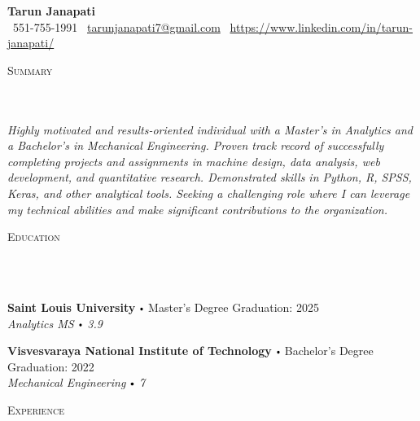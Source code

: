 \documentclass{article}
\newcommand{\school}[4]{
        \textbf{#1} \labelitemi #2 \hfill #3 \\ #4 \vspace*{5pt}
      }
\newcommand{\lineunder}{
        \vspace*{-8pt} \\ \hspace*{-18pt} 
        \hrulefill \\
        }
\newcommand{\header}[1]{{
        \hspace*{-15pt}\vspace*{6pt} \textsc{#1}} \vspace*{-6pt} 
        \lineunder
        }
\renewcommand{\labelitemi}{
        $\vcenter{\hbox{\tiny$\bullet$}}$\hspace*{3pt}
        }
\begin{document}
  
      \small
      \smallskip
      \vspace*{-44pt}
  
      \begin{center}
        {\LARGE \textbf{Tarun Janapati}} \\
        \faPhone\ 551-755-1991 \quad
        \faEnvelope\ \href{mailto:tarunjanapati7@gmail.com}{tarunjanapati7@gmail.com} \quad
        \faLinkedin\ \url{https://www.linkedin.com/in/tarun-janapati/}
      \end{center}
     \vspace*{4pt}%
      \header{Summary}
  
      {
        \textit{ Highly motivated and results-oriented individual with a Master's in Analytics and a Bachelor's in Mechanical Engineering. Proven track record of successfully completing projects and assignments in machine design, data analysis, web development, and quantitative research. Demonstrated skills in Python, R, SPSS, Keras, and other analytical tools. Seeking a challenging role where I can leverage my technical abilities and make significant contributions to the organization.}
        }
  
      \vspace{15pt}
  
     \header{Education}
  
      {
        \school{Saint Louis University}{Master's Degree}{Graduation: 2025}{\textit{Analytics MS \labelitemi 3.9}}
        

        \school{Visvesvaraya National Institute of Technology}{Bachelor's Degree}{Graduation: 2022}{\textit{Mechanical Engineering \labelitemi 7}}
        }
  
      \vspace*{4pt}%
      \header{Experience}
  
\end{document}
